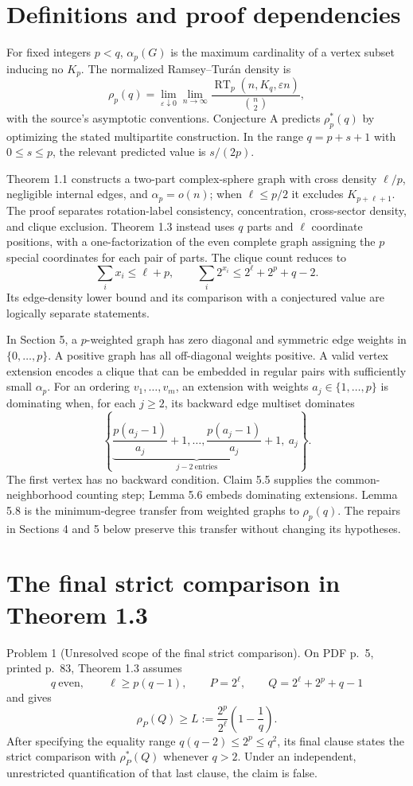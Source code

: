 \documentclass[10pt]{article}
\begin{document}
\section*{Definitions and proof dependencies}
For fixed integers \(p<q\), \(\alpha_p(G)\) is the maximum cardinality of a vertex subset inducing no \(K_p\). The normalized Ramsey–Turán density is \[\rho_p(q)=\lim_{\varepsilon\downarrow0}\lim_{n\to\infty}
 \frac{\operatorname{RT}_p(n,K_q,\varepsilon n)}{\binom n2},\] with the source’s asymptotic conventions. Conjecture A predicts \(\rho_p^*(q)\) by optimizing the stated multipartite construction. In the range \(q=p+s+1\) with \(0\leq s\leq p\), the relevant predicted value is \(s/(2p)\).\par
Theorem 1.1 constructs a two-part complex-sphere graph with cross density \(\ell/p\), negligible internal edges, and \(\alpha_p=o(n)\); when \(\ell\leq p/2\) it excludes \(K_{p+\ell+1}\). The proof separates rotation-label consistency, concentration, cross-sector density, and clique exclusion. Theorem 1.3 instead uses \(q\) parts and \(\ell\) coordinate positions, with a one-factorization of the even complete graph assigning the \(p\) special coordinates for each pair of parts. The clique count reduces to \[\sum_i x_i\leq\ell+p,\qquad
 \sum_i 2^{x_i}\leq 2^\ell+2^p+q-2.\] Its edge-density lower bound and its comparison with a conjectured value are logically separate statements.\par
In Section 5, a \(p\)-weighted graph has zero diagonal and symmetric edge weights in \(\{0,\ldots,p\}\). A positive graph has all off-diagonal weights positive. A valid vertex extension encodes a clique that can be embedded in regular pairs with sufficiently small \(\alpha_p\). For an ordering \(v_1,\ldots,v_m\), an extension with weights \(a_j\in\{1,\ldots,p\}\) is dominating when, for each \(j\geq2\), its backward edge multiset dominates \[\left\{
 \underbrace{\frac{p(a_j-1)}{a_j}+1,\ldots,
             \frac{p(a_j-1)}{a_j}+1}_{j-2\ \text{entries}},\
 a_j\right\}.\] The first vertex has no backward condition. Claim 5.5 supplies the common-neighborhood counting step; Lemma 5.6 embeds dominating extensions. Lemma 5.8 is the minimum-degree transfer from weighted graphs to \(\rho_p(q)\). The repairs in Sections 4 and 5 below preserve this transfer without changing its hypotheses.\par
\section*{The final strict comparison in Theorem 1.3}
Problem 1 (Unresolved scope of the final strict comparison).  On PDF p. 5, printed p. 83, Theorem 1.3 assumes \[q\ \text{even},\qquad \ell\geq p(q-1),\qquad
 P=2^\ell,\qquad Q=2^\ell+2^p+q-1\] and gives \[\rho_P(Q)\geq L:=
 \frac{2^p}{2^\ell}\left(1-\frac1q\right).\] After specifying the equality range \(q(q-2)\leq2^p\leq q^2\), its final clause states the strict comparison with \(\rho_P^*(Q)\) whenever \(q>2\). Under an independent, unrestricted quantification of that last clause, the claim is false.\par
\end{document}
